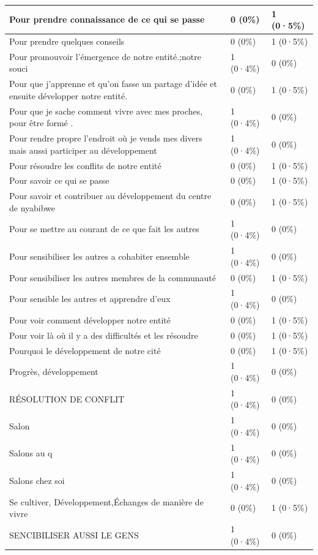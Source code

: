 \documentclass[
]{book}
\begin{document}
\begin{tabular}{l|l|l}
\hline
Pour prendre connaissance de ce qui se passe & 0 (0\%) & 1 (0·5\%)\\
\hline
Pour prendre quelques conseils & 0 (0\%) & 1 (0·5\%)\\
\hline
Pour promouvoir l'émergence de notre entité.;notre souci & 1 (0·4\%) & 0 (0\%)\\
\hline
Pour que j'apprenne et qu'on fasse un partage d'idée et ensuite développer notre entité. & 0 (0\%) & 1 (0·5\%)\\
\hline
Pour que je sache comment vivre avec mes proches, pour être formé . & 1 (0·4\%) & 0 (0\%)\\
\hline
Pour rendre propre l'endroit où je vends mes divers mais aussi participer au développement & 1 (0·4\%) & 0 (0\%)\\
\hline
Pour résoudre les conflits de notre entité & 0 (0\%) & 1 (0·5\%)\\
\hline
Pour savoir ce qui se passe & 0 (0\%) & 1 (0·5\%)\\
\hline
Pour savoir et contribuer au développement du centre de nyabibwe & 0 (0\%) & 1 (0·5\%)\\
\hline
Pour se mettre au courant de ce que fait les autres & 1 (0·4\%) & 0 (0\%)\\
\hline
Pour sensibiliser les autres a cohabiter ensemble & 1 (0·4\%) & 0 (0\%)\\
\hline
Pour sensibiliser les autres membres de la communauté & 0 (0\%) & 1 (0·5\%)\\
\hline
Pour sensible les autres et apprendre d'eux & 1 (0·4\%) & 0 (0\%)\\
\hline
Pour voir comment développer notre entité & 0 (0\%) & 1 (0·5\%)\\
\hline
Pour voir là où il y a des difficultés et les résoudre & 0 (0\%) & 1 (0·5\%)\\
\hline
Pourquoi le développement de notre cité & 0 (0\%) & 1 (0·5\%)\\
\hline
Progrès, développement & 1 (0·4\%) & 0 (0\%)\\
\hline
RÉSOLUTION DE CONFLIT & 1 (0·4\%) & 0 (0\%)\\
\hline
Salon & 1 (0·4\%) & 0 (0\%)\\
\hline
Salons au q & 1 (0·4\%) & 0 (0\%)\\
\hline
Salons chez soi & 1 (0·4\%) & 0 (0\%)\\
\hline
Se cultiver, Développement,Échanges de  manière de vivre & 0 (0\%) & 1 (0·5\%)\\
\hline
SENCIBILISER AUSSI LE GENS & 1 (0·4\%) & 0 (0\%)\\

\end{tabular}
\end{document}
